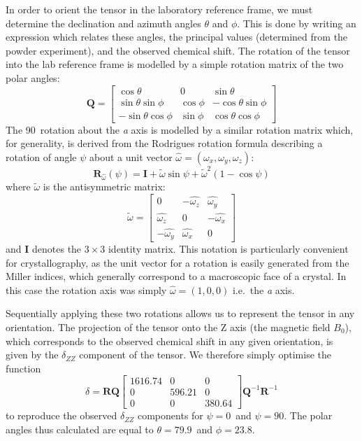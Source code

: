 \begin{refsection}
In order to orient the tensor in the laboratory reference frame, we must determine the declination and azimuth angles $\theta$ and $\phi$.
This is done by writing an expression which relates these angles, the principal values (determined from the powder experiment), and the observed chemical shift.
The rotation of the tensor into the lab reference frame is modelled by a simple rotation matrix of the two polar angles:
\begin{equation}
  \mathbf{Q} = \begin{bmatrix} \cos\theta & 0 & \sin\theta \\ \sin\theta\sin\phi  & \cos\phi & -\cos\theta\sin\phi \\ -\sin\theta\cos\phi & \sin\phi & \cos\theta\cos\phi \end{bmatrix}
\end{equation}
The 90\degree\ rotation about the \textit{a} axis is modelled by a similar rotation matrix which, for generality, is derived from the Rodrigues rotation formula describing a rotation of angle $\psi$ about a unit vector $\hat{\omega} = \left( \omega_{x}, \omega_{y}, \omega_{z} \right)$:
\begin{equation}
  \mathbf{R}_{\hat{\omega}}(\psi) = \mathbf{I} + \tilde{\omega}\sin\psi + \tilde{\omega}^{2}(1-\cos\psi)
\end{equation}
where $\tilde{\omega}$ is the antisymmetric matrix:
\begin{equation}
  \tilde{\omega} = \begin{bmatrix} 0 & -\hat{\omega_{z}} & \hat{\omega_{y}} \\ \hat{\omega_{z}} & 0 & -\hat{\omega_{x}} \\ -\hat{\omega_{y}} & \hat{\omega_{x}} & 0 \end{bmatrix}
\end{equation}
and $\mathbf{I}$ denotes the $3\times 3$ identity matrix.
This notation is particularly convenient for crystallography, as the unit vector for a rotation is easily generated from the Miller indices, which generally correspond to a macroscopic face of a crystal.
In this case the rotation axis was simply $\hat{\omega} = (1,0,0)$ i.e.\ the \textit{a} axis.

Sequentially applying these two rotations allows us to represent the tensor in any orientation.
The projection of the tensor onto the Z axis (the magnetic field $B_{0}$), which corresponds to the observed chemical shift in any given orientation, is given by the $\delta_{ZZ}$ component of the tensor.
We therefore simply optimise the function
\begin{equation}
  \delta = \mathbf{R} \mathbf{Q} \begin{bmatrix} 1616.74 & 0 & 0 \\ 0 & 596.21 & 0 \\ 0 & 0 & 380.64 \end{bmatrix} \mathbf{Q}^{-1} \mathbf{R}^{-1}
\end{equation}
to reproduce the observed $\delta_{ZZ}$ components for $\psi = 0$\degree\ and $\psi = 90$\degree.
The polar angles thus calculated are equal to $\theta = 79.9$\degree\ and $\phi = 23.8$\degree.


\end{refsection}
